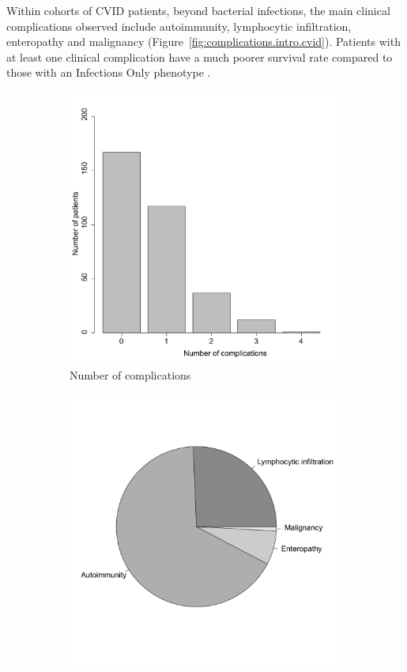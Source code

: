 Within cohorts of CVID patients, beyond bacterial infections, the main clinical complications observed include autoimmunity, lymphocytic infiltration, enteropathy and malignancy (Figure~\ref{fig:complications.intro.cvid}). Patients with at least one clinical complication have a much poorer survival rate compared to those with an Infections Only phenotype \parencite{Chapel2008}.

\begin{figure}[H]
\centering
\begin{subfigure}[b]{0.49\textwidth}
	\centering
	\includegraphics[width=\textwidth]{./Introduction/Barplot_complications_cvid.pdf}%
	\caption{Number of complications}%
\end{subfigure}
\begin{subfigure}[b]{0.49\textwidth}
	\centering
	\includegraphics[width=\textwidth]{./Introduction/Pie_1complication.pdf}%

\end{subfigure}
\end{figure}
